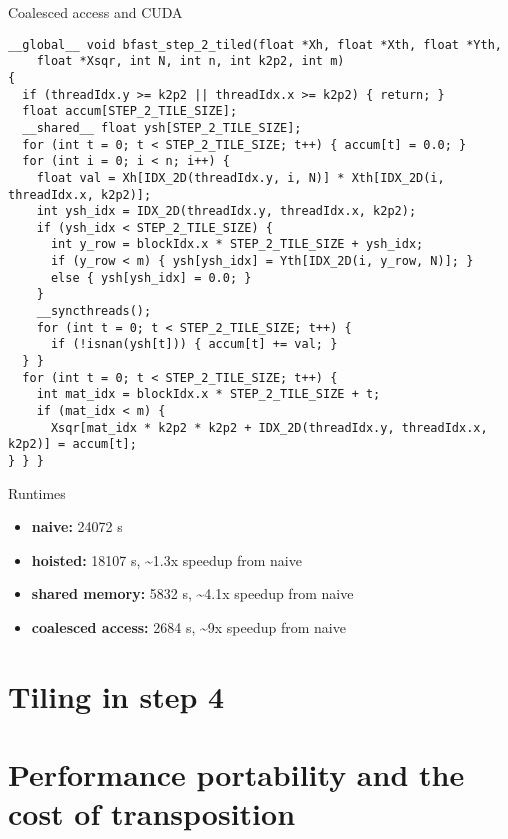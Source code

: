 \begin{frame}[fragile]{Coalesced access and CUDA}
\begin{verbatim}
__global__ void bfast_step_2_tiled(float *Xh, float *Xth, float *Yth,
    float *Xsqr, int N, int n, int k2p2, int m)
{
  if (threadIdx.y >= k2p2 || threadIdx.x >= k2p2) { return; }
  float accum[STEP_2_TILE_SIZE];
  __shared__ float ysh[STEP_2_TILE_SIZE];
  for (int t = 0; t < STEP_2_TILE_SIZE; t++) { accum[t] = 0.0; }
  for (int i = 0; i < n; i++) {
    float val = Xh[IDX_2D(threadIdx.y, i, N)] * Xth[IDX_2D(i, threadIdx.x, k2p2)];
    int ysh_idx = IDX_2D(threadIdx.y, threadIdx.x, k2p2);
    if (ysh_idx < STEP_2_TILE_SIZE) {
      int y_row = blockIdx.x * STEP_2_TILE_SIZE + ysh_idx;
      if (y_row < m) { ysh[ysh_idx] = Yth[IDX_2D(i, y_row, N)]; }
      else { ysh[ysh_idx] = 0.0; }
    }
    __syncthreads();
    for (int t = 0; t < STEP_2_TILE_SIZE; t++) {
      if (!isnan(ysh[t])) { accum[t] += val; }
  } }
  for (int t = 0; t < STEP_2_TILE_SIZE; t++) {
    int mat_idx = blockIdx.x * STEP_2_TILE_SIZE + t;
    if (mat_idx < m) {
      Xsqr[mat_idx * k2p2 * k2p2 + IDX_2D(threadIdx.y, threadIdx.x, k2p2)] = accum[t];
} } }
\end{verbatim}
\end{frame}

\begin{frame}[fragile]{Runtimes}
\begin{itemize}
  \item  \textbf{naive:} 24072 \textmu s
  \item  \textbf{hoisted:} 18107 \textmu s, \textasciitilde 1.3x speedup from naive
  \item  \textbf{shared memory:} 5832 \textmu s, \textasciitilde 4.1x speedup from naive
  \item  \textbf{coalesced access:} 2684 \textmu s, \textasciitilde 9x speedup from naive
\end{itemize}
\end{frame}

\section{Tiling in step 4}

\section{Performance portability and the cost of transposition}

